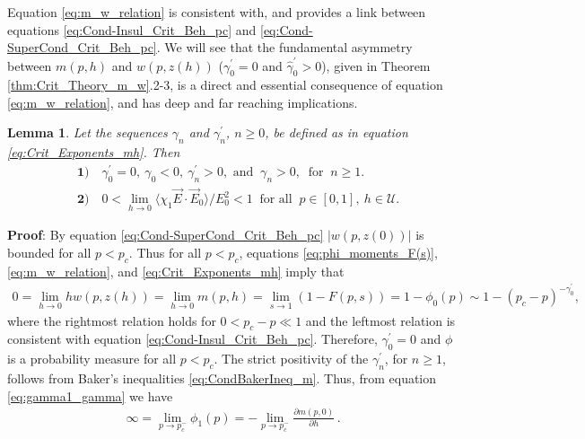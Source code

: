 \documentclass[english,12pt,jmp,graphicx]{revtex4-1}
\newtheorem{lemma}{Lemma}[section]
\newcommand{\gh}{\hat{\gamma}}
\begin{document}
Equation \eqref{eq:m_w_relation} is consistent with, and provides a
link between equations \eqref{eq:Cond-Insul_Crit_Beh_pc} and
\eqref{eq:Cond-SuperCond_Crit_Beh_pc}. We will see that the
fundamental asymmetry  between $m(p,h)$ and $w(p,z(h))$ ($\gamma_0^\prime=0$ and
$\gh_0^\prime>0$), given in Theorem \ref{thm:Crit_Theory_m_w}.2-3, is a
direct and essential consequence of equation \eqref{eq:m_w_relation},
and has deep and far reaching implications.      
%
\begin{lemma}\label{lem:zero_gamma0}
  Let the sequences $\gamma_n$ and $\gamma_n^\prime$, $n\geq0$, be defined as in
  equation \eqref{eq:Crit_Exponents_mh}. Then
  \begin{align*}
    &\mathbf{1)} \quad \gamma_0^\prime=0, \ \gamma_0<0, \ \gamma_n^\prime>0,   \text{ and } \ \gamma_n>0, \
        \text{ for } \ n\geq1. \\
    &\mathbf{2)} \quad 0<\lim_{h\to0}\langle\chi_1\vec{E}\cdot\vec{E}_0\rangle/E_0^2<1 \
         \text{ for all } \ p\in[0,1], \ h\in\mathcal{U}.
  \end{align*}
\end{lemma}
%
\noindent \textbf{Proof}:
%
By equation \eqref{eq:Cond-SuperCond_Crit_Beh_pc} $|w(p,z(0))|$ is  
bounded for all $p<p_c$. Thus for all $p<p_c$, equations
\eqref{eq:phi_moments_F(s)}, \eqref{eq:m_w_relation},
and \eqref{eq:Crit_Exponents_mh} imply that
%
\begin{align*}
  0=\lim_{h\to0}hw(p,z(h))=\lim_{h\to0}m(p,h)=\lim_{s\to1}(1-F(p,s))=1-\phi_0(p)\sim1-(p_c-p)^{-\gamma_0^\prime},
\end{align*}
%
where the rightmost relation holds for $0<p_c-p\ll1$ and the leftmost
relation is consistent with equation
\eqref{eq:Cond-Insul_Crit_Beh_pc}. Therefore, $\gamma_0^\prime=0$ and $\phi$ is a
probability measure for all $p<p_c$. The strict positivity of the
$\gamma_n^\prime$, for $n\geq1$, follows from Baker's inequalities
\eqref{eq:CondBakerIneq_m}. Thus, from equation
\eqref{eq:gamma1_gamma} we have 
%
\begin{align}\label{eq:div_phi1}
  \infty=\lim_{p\to p_c^-}\phi_1(p)=-\lim_{p\to p_c^-}\frac{\partial m(p,0)}{\partial h}\,.
\end{align}
%
\end{document}
